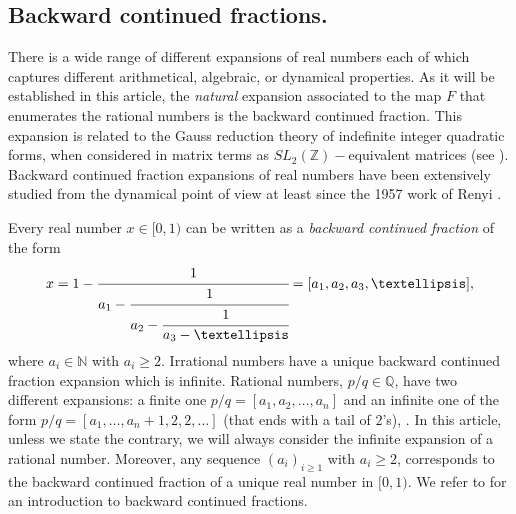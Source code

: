 \documentclass[letterpaper,10pt,reqno]{amsart}
\numberwithin{equation}{section}     %
\newcommand{\Z}{\mathbb{Z}}
\newcommand{\N}{\mathbb{N}}
\def\N{{\mathbb N}}
\def\Z{{\mathbb Z}}
\def\Q{{\mathbb Q}}
\begin{document}
 
 \subsection{Backward continued fractions.} There is a wide range of different expansions of real numbers each of which captures different arithmetical, algebraic, or dynamical properties. As it will be established in this article, the \emph{natural} expansion associated to the map $F$ that enumerates the rational numbers is the backward continued fraction. This expansion is related to the Gauss reduction theory of indefinite integer quadratic forms, when considered in matrix terms as $SL_2(\Z)-$equivalent matrices (see \cite{ka,z}). Backward continued fraction expansions of real numbers have been extensively studied from the dynamical point of view at least since the 1957 work of Renyi \cite{re}. 
 
Every real number $x \in [0,1)$ can be written as a \emph{backward continued fraction} of the form
\begin{equation*}
x = 1- \textrm{ } \cfrac{1}{a_1 - \cfrac{1}{a_2 - \cfrac{1}{a_3 - \dots}}} = \textrm{ } [a_1, a_2, a_3, \dots],
\end{equation*}
where $a_i \in \N$ with $a_i \geq 2$. Irrational numbers  have a unique  backward continued fraction expansion which is infinite. Rational numbers, $p/q \in \Q$,  have two different expansions: a finite one $p/q=[a_1, a_2, \dots, a_n]$  and an infinite one of the form $p/q=[a_1, \dots, a_{n}+1, 2,2, \dots ]$ (that ends with a tail of $2$'s), \cite[Theorem 1.2]{ka}. In this article, unless we {{}{state}} the contrary,  we will always consider the infinite expansion of a rational number.  Moreover, any sequence $(a_i)_{i\geq 1}$ with $a_i\geq 2$, corresponds to the backward continued fraction of a unique real number in $[0,1)$. We refer to \cite{bl, ka} for an introduction to backward continued fractions. 
\end{document}
